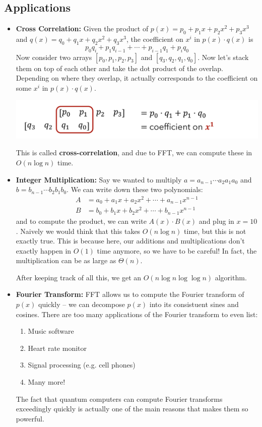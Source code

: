 \subsection{Applications}
\begin{itemize}
	\item \textbf{Cross Correlation:}
		Given the product of \( p(x) = p_0 + p_1x + p_2x^2 + p_3x^3 \) and \( q(x) = q_0 + q_1x + q_2x^2 + q_3x^3 \), the 
		coefficient on \( x^{i} \) in \( p(x) \cdot q(x) \) is
		\[
		p_0q_{i} + p_1q_{i-1} + \cdots + p_{i-1}q_{1} + p_{i}q_0
		\] 
		Now consider two arrays \( [p_0, p_1, p_2, p_3] \) and \( [q_3, q_2, q_1, q_0] \). Now let's stack them on top of each 
		other and take the dot product of the overlap. Depending on where they overlap, it actually corresponds to the coefficient 
		on some \( x^{i} \) in \( p(x) \cdot q(x) \).  
		\begin{center}
			\includegraphics[scale=0.5]{cross-correlation.png}
		\end{center}
		This is called \textbf{cross-correlation}, and due to FFT, we can compute these in \( O(n \log n) \) time.   
	\item  \textbf{Integer Multiplication:} Say we wanted to multiply \( a = a_{n-1} \cdots a_2a_1a_0 \) and 
		\( b = b_{n-1}\cdots b_2b_1b_0 \). We can write down these two polynomials:
		\begin{align*}
			A &= a_0 + a_1x + a_2x^2 + \cdots + a_{n-1}x^{n-1}\\
			B&= b_0 + b_1x + b_2x^2 + \cdots + b_{n-1}x^{n-1} 
		\end{align*}
		and to compute the product, we can write \( A(x) \cdot B(x) \) and plug in \( x = 10 \). Naively we would think that 
		this takes \( O(n \log n) \) time, but this is not exactly true. This is because here, our additions and multiplications 
		don't exactly happen in \( O(1) \) time anymore, so we have to be careful! In fact, the multiplication can be as 
		large as \( \Theta(n) \). 

		After keeping track of all this, we get an \( O(n \log n \log \log n) \) algorithm. 
	\item \textbf{Fourier Transform:} FFT allows us to compute the Fourier transform of \( p(x) \) quickly -- we can decompose 
		 \( p(x) \) into its consistuent sines and cosines. There are too many applications of the Fourier transform to 
		 even list: 
		 \begin{enumerate}[label=\arabic*.]
		 	\item Music software
			\item Heart rate monitor
			\item Signal processing (e.g. cell phones)
			\item Many more!
		 \end{enumerate}
		 The fact that quantum computers can compute Fourier transforms exceedingly quickly is actually one of the main reasons 
		 that makes them so powerful.
\end{itemize}
